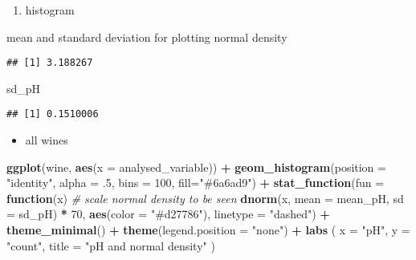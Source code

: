 \documentclass[
]{article}
\newenvironment{Shaded}{\begin{snugshade}}{\end{snugshade}}
\newcommand{\AttributeTok}[1]{\textcolor[rgb]{0.13,0.29,0.53}{#1}}
\newcommand{\CommentTok}[1]{\textcolor[rgb]{0.56,0.35,0.01}{\textit{#1}}}
\newcommand{\ControlFlowTok}[1]{\textcolor[rgb]{0.13,0.29,0.53}{\textbf{#1}}}
\newcommand{\DecValTok}[1]{\textcolor[rgb]{0.00,0.00,0.81}{#1}}
\newcommand{\FunctionTok}[1]{\textcolor[rgb]{0.13,0.29,0.53}{\textbf{#1}}}
\newcommand{\NormalTok}[1]{#1}
\newcommand{\OtherTok}[1]{\textcolor[rgb]{0.56,0.35,0.01}{#1}}
\newcommand{\SpecialCharTok}[1]{\textcolor[rgb]{0.81,0.36,0.00}{\textbf{#1}}}
\newcommand{\StringTok}[1]{\textcolor[rgb]{0.31,0.60,0.02}{#1}}
\providecommand{\tightlist}{%
  \setlength{\itemsep}{0pt}\setlength{\parskip}{0pt}}
\begin{document}
\begin{enumerate}
\def\labelenumi{\alph{enumi}.}
\tightlist
\item
  histogram
\end{enumerate}

mean and standard deviation for plotting normal density

\begin{Shaded}
\end{Shaded}

\begin{verbatim}
## [1] 3.188267
\end{verbatim}

\begin{Shaded}
\begin{Highlighting}[]
\NormalTok{sd\_pH}
\end{Highlighting}
\end{Shaded}

\begin{verbatim}
## [1] 0.1510006
\end{verbatim}

\begin{itemize}
\tightlist
\item
  all wines
\end{itemize}

\begin{Shaded}
\begin{Highlighting}[]
\FunctionTok{ggplot}\NormalTok{(wine, }\FunctionTok{aes}\NormalTok{(}\AttributeTok{x =}\NormalTok{ analysed\_variable)) }\SpecialCharTok{+}
  \FunctionTok{geom\_histogram}\NormalTok{(}\AttributeTok{position =} \StringTok{"identity"}\NormalTok{, }\AttributeTok{alpha =}\NormalTok{ .}\DecValTok{5}\NormalTok{, }\AttributeTok{bins =} \DecValTok{100}\NormalTok{, }\AttributeTok{fill=}\StringTok{"\#6a6ad9"}\NormalTok{) }\SpecialCharTok{+}
  \FunctionTok{stat\_function}\NormalTok{(}\AttributeTok{fun =} \ControlFlowTok{function}\NormalTok{(x) }\CommentTok{\# scale normal density to be seen}
    \FunctionTok{dnorm}\NormalTok{(x, }\AttributeTok{mean =}\NormalTok{ mean\_pH, }\AttributeTok{sd =}\NormalTok{ sd\_pH) }\SpecialCharTok{*} \DecValTok{70}\NormalTok{, }\FunctionTok{aes}\NormalTok{(}\AttributeTok{color =} \StringTok{"\#d27786"}\NormalTok{), }\AttributeTok{linetype =} \StringTok{"dashed"}\NormalTok{) }\SpecialCharTok{+}
  \FunctionTok{theme\_minimal}\NormalTok{() }\SpecialCharTok{+}
  \FunctionTok{theme}\NormalTok{(}\AttributeTok{legend.position =} \StringTok{"none"}\NormalTok{) }\SpecialCharTok{+}
  \FunctionTok{labs}\NormalTok{ (}
    \AttributeTok{x =} \StringTok{"pH"}\NormalTok{,}
    \AttributeTok{y =} \StringTok{"count"}\NormalTok{,}
    \AttributeTok{title =} \StringTok{"pH and normal density"}
\NormalTok{  )}
\end{Highlighting}
\end{Shaded}
\end{document}
